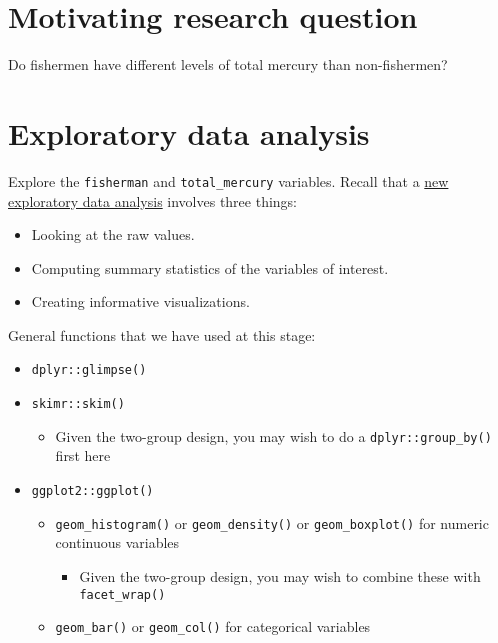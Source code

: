 \documentclass[]{article}
\providecommand{\tightlist}{%
  \setlength{\itemsep}{0pt}\setlength{\parskip}{0pt}}
\begin{document}
\section{Motivating research
question}\label{motivating-research-question}

Do fishermen have different levels of total mercury than non-fishermen?

\section{Exploratory data analysis}\label{exploratory-data-analysis}

Explore the \texttt{fisherman} and \texttt{total\_mercury} variables.
Recall that a
\href{http://moderndive.netlify.com/6-regression.html\#model1EDA}{new
exploratory data analysis} involves three things:

\begin{itemize}
\tightlist
\item
  Looking at the raw values.
\item
  Computing summary statistics of the variables of interest.
\item
  Creating informative visualizations.
\end{itemize}

General functions that we have used at this stage:

\begin{itemize}
\tightlist
\item
  \texttt{dplyr::glimpse()}
\item
  \texttt{skimr::skim()}

  \begin{itemize}
  \tightlist
  \item
    Given the two-group design, you may wish to do a
    \texttt{dplyr::group\_by()} first here
  \end{itemize}
\item
  \texttt{ggplot2::ggplot()}

  \begin{itemize}
  \tightlist
  \item
    \texttt{geom\_histogram()} or \texttt{geom\_density()} or
    \texttt{geom\_boxplot()} for numeric continuous variables

    \begin{itemize}
    \tightlist
    \item
      Given the two-group design, you may wish to combine these with
      \texttt{facet\_wrap()}
    \end{itemize}
  \item
    \texttt{geom\_bar()} or \texttt{geom\_col()} for categorical
    variables
  \end{itemize}
\end{itemize}
\end{document}
